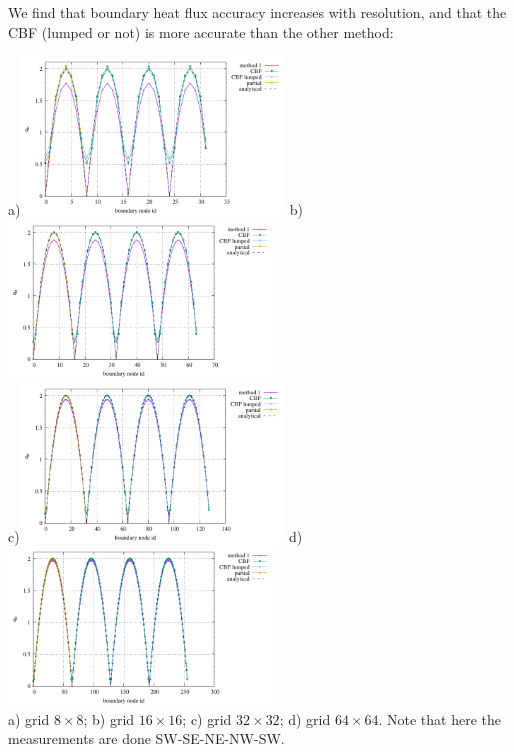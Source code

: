 We find that boundary heat flux accuracy increases with resolution, and that the 
CBF (lumped or not) is more accurate than the other method:
\begin{center}
a)\includegraphics[width=7cm]{python_codes/fieldstone_173/results/exp2/8x8/heat_flux_boundary.pdf}
b)\includegraphics[width=7cm]{python_codes/fieldstone_173/results/exp2/16x16/heat_flux_boundary.pdf}\\
c)\includegraphics[width=7cm]{python_codes/fieldstone_173/results/exp2/32x32/heat_flux_boundary.pdf}
d)\includegraphics[width=7cm]{python_codes/fieldstone_173/results/exp2/64x64/heat_flux_boundary.pdf}\\
{\captionfont a) grid $8\times 8$; b) grid $16\times 16$;
c) grid $32\times 32$; d) grid $64\times 64$. 
Note that here the measurements are done SW-SE-NE-NW-SW.}
\end{center}

